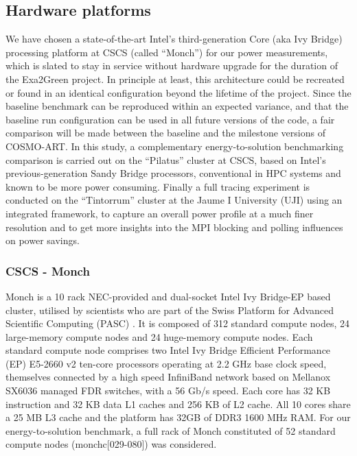 \subsection{Hardware platforms}
\label{subsec:3.1}

We have  chosen a state-of-the-art Intel's  third-generation Core (aka
Ivy  Bridge) processing platform  at CSCS  (called ``Monch'')  for our
power  measurements,  which  is  slated  to stay  in  service  without
hardware  upgrade  for the  duration  of  the  Exa2Green project.   In
principle at least,  this architecture could be recreated  or found in
an identical configuration beyond  the lifetime of the project.  Since
the baseline benchmark can  be reproduced within an expected variance,
and  that the baseline  run configuration  can be  used in  all future
versions  of the  code, a  fair comparison  will be  made  between the
baseline and  the milestone versions  of COSMO-ART.  In this  study, a
complementary  energy-to-solution benchmarking  comparison  is carried
out   on  the   ``Pilatus''  cluster   at  CSCS,   based   on  Intel's
previous-generation  Sandy  Bridge  processors,  conventional  in  HPC
systems and known to be  more power consuming.  Finally a full tracing
experiment is  conducted on the  ``Tintorrum'' cluster at the  Jaume I
University (UJI) using an  integrated framework, to capture an overall
power profile at a much finer resolution and to get more insights into
the MPI blocking and polling influences on power savings.

\subsubsection{CSCS - Monch}
Monch is  a 10 rack  NEC-provided and dual-socket Intel  Ivy Bridge-EP
based  cluster, utilised  by  scientists  who are  part  of the  Swiss
Platform for Advanced Scientific  Computing (PASC) \citep{PASC}. It is
composed of 312 standard  compute nodes, 24 large-memory compute nodes
and  24  huge-memory  compute   nodes.   Each  standard  compute  node
comprises two  Intel Ivy Bridge Efficient Performance  (EP) E5-2660 v2
ten-core processors operating at  2.2 GHz base clock speed, themselves
connected by a high speed  InfiniBand network based on Mellanox SX6036
managed  FDR switches,  with a  56 Gb/s  speed.  Each  core has  32 KB
instruction and 32  KB data L1 caches  and 256 KB of L2  cache. All 10
cores share a  25 MB L3 cache  and the platform has 32GB  of DDR3 1600
MHz RAM.  For our energy-to-solution  benchmark, a full rack  of Monch
constituted  of  52   standard  compute  nodes  (monchc[029-080])  was
considered.

